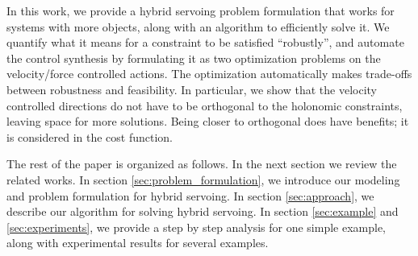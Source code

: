 In this work, we provide a hybrid servoing problem formulation that works for systems with more objects, along with an algorithm to efficiently solve it.
We quantify what it means for a constraint to be satisfied ``robustly'', and automate the control synthesis by formulating it as two optimization problems on the velocity/force controlled actions. The optimization automatically makes trade-offs between robustness and feasibility.
In particular, we show that the velocity controlled directions do not have to be orthogonal to the holonomic constraints, leaving space for more solutions. Being closer to orthogonal does have benefits; it is considered in the cost function.

The rest of the paper is organized as follows. In the next section we review the related works. In section \ref{sec:problem_formulation}, we introduce our modeling and problem formulation for hybrid servoing. In section \ref{sec:approach}, we describe our algorithm for solving hybrid servoing. In section \ref{sec:example} and \ref{sec:experiments}, we provide a step by step analysis for one simple example, along with experimental results for several examples.

